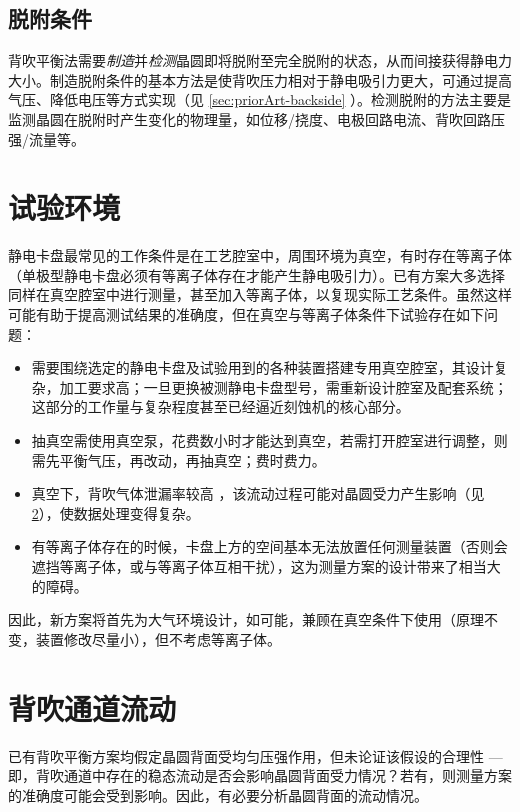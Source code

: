 \subsection{脱附条件}\label{sec:principle-backside-dechuck}

背吹平衡法需要\emph{制造}并\emph{检测}晶圆即将脱附至完全脱附的状态，从而间接获得静电力大小。制造脱附条件的基本方法是使背吹压力相对于静电吸引力更大，可通过提高气压、降低电压等方式实现（见 \ref{sec:priorArt-backside} ）。检测脱附的方法主要是监测晶圆在脱附时产生变化的物理量，如位移/挠度、电极回路电流、背吹回路压强/流量等。 %



\section{试验环境}\label{sec:principle-env}

静电卡盘最常见的工作条件是在工艺腔室中，周围环境为真空，有时存在等离子体（单极型静电卡盘必须有等离子体存在才能产生静电吸引力）。已有方案大多选择同样在真空腔室中进行测量，甚至加入等离子体，以复现实际工艺条件。虽然这样可能有助于提高测试结果的准确度，但在真空与等离子体条件下试验存在如下问题：
\begin{itemize}
  \item 需要围绕选定的静电卡盘及试验用到的各种装置搭建专用真空腔室，其设计复杂，加工要求高；一旦更换被测静电卡盘型号，需重新设计腔室及配套系统；这部分的工作量与复杂程度甚至已经逼近刻蚀机的核心部分。
  \item 抽真空需使用真空泵，花费数小时才能达到真空，若需打开腔室进行调整，则需先平衡气压，再改动，再抽真空；费时费力。
  \item 真空下，背吹气体泄漏率较高 %
  ，该流动过程可能对晶圆受力产生影响（见\ref{sec:principle-flow}），使数据处理变得复杂。
  \item 有等离子体存在的时候，卡盘上方的空间基本无法放置任何测量装置（否则会遮挡等离子体，或与等离子体互相干扰），这为测量方案的设计带来了相当大的障碍。
\end{itemize}

因此，新方案将首先为大气环境设计，如可能，兼顾在真空条件下使用（原理不变，装置修改尽量小），但不考虑等离子体。



\section{背吹通道流动}\label{sec:principle-flow}

已有背吹平衡方案均假定晶圆背面受均匀压强作用，但未论证该假设的合理性 ---  即，背吹通道中存在的稳态流动是否会影响晶圆背面受力情况？若有，则测量方案的准确度可能会受到影响。因此，有必要分析晶圆背面的流动情况。


